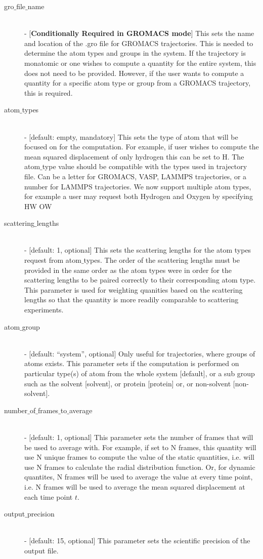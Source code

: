 \documentclass{article}
\begin{document}
\begin{description}
	\item[gro$\_$file$\_$name] \hfill \\
	- [\textbf{Conditionally Required in GROMACS mode}] This sets the name and location of the .gro file for GROMACS trajectories.  This is needed to determine the atom types and groups in the system.  If the trajectory is monatomic or one wishes to compute a quantity for the entire system, this does not need to be provided.  However, if the user wants to compute a quantity for a specific atom type or group from a GROMACS trajectory, this is required.
	
	\item[atom$\_$types] \hfill \\
	- [default: empty, mandatory]  This sets the type of atom that will be focused on for the computation.  For example, if user wishes to compute the mean squared displacement of only hydrogen this can be set to H.   The atom$\_$type value should be compatible with the types used in trajectory file. Can be a letter for GROMACS,  VASP,  LAMMPS trajectories, or a number for LAMMPS trajectories.  We now support multiple atom types, for example a user may request both Hydrogen and Oxygen by specifying HW OW
	
	\item[scattering$\_$lengths] \hfill \\
	- [default: 1, optional] This sets the scattering lengths for the atom types request from atom$\_$types.  The order of the scattering lengths must be provided in the same order as the atom types were in order for the scattering lengths to be paired correctly to their corresponding atom type.  This parameter is used for weighting quanities based on the scattering lengths so that the quantity is more readily comparable to scattering experiments.
	
	\item[atom$\_$group] \hfill \\
	- [default: ``system'', optional]  Only useful for trajectories, where groups of atoms exists.  This parameter sets if the computation is performed on particular type(s) of atom from the whole system [default], or a sub group such as the solvent [solvent], or protein [protein] or, or non-solvent [non-solvent].
	
	\item[number$\_$of$\_$frames$\_$to$\_$average] \hfill \\
	- [default: 1, optional] This parameter sets the number of frames that will be used to average with.  For example, if set to N frames, this quantity will use N unique frames to compute the value of the static quantities, i.e. will use N frames to calculate the radial distribution function.  Or, for dynamic quantites, N frames will be used to average the value at every time point, i.e. N frames will be used to average the mean squared displacement at each time point $t$.
	
	\item[output$\_$precision] \hfill \\
	- [default: 15, optional] This parameter sets the scientific precision of the output file.
	
	
\end{description}
\end{document}
